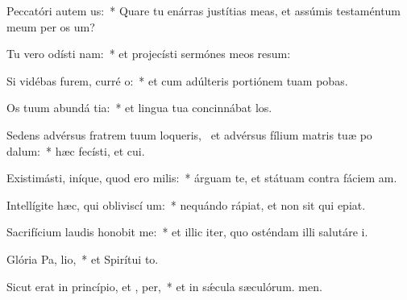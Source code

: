\item Peccatóri autem  us:~* Quare tu enárras justítias meas, et assúmis testaméntum meum per os um?
\item Tu vero odísti nam:~* et projecísti sermónes meos resum:
\item Si vidébas furem, curré  o:~* et cum adúlteris portiónem tuam pobas.
\item Os tuum abundá tia:~* et lingua tua concinnábat los.
\item Sedens advérsus fratrem tuum loqueris,~\pscross{} et advérsus fílium matris tuæ po dalum:~* hæc fecísti, et cui.
\item Existimásti, iníque, quod ero  milis:~* árguam te, et státuam contra fáciem am.
\item Intellígite hæc, qui obliviscí um:~* nequándo rápiat, et non sit qui epiat.
\item Sacrifícium laudis honobit me:~* et illic iter, quo osténdam illi salutáre i.
\item Glória Pa,  lio,~* et Spirítui to.
\item Sicut erat in princípio, et ,  per,~* et in sǽcula sæculórum. men.
